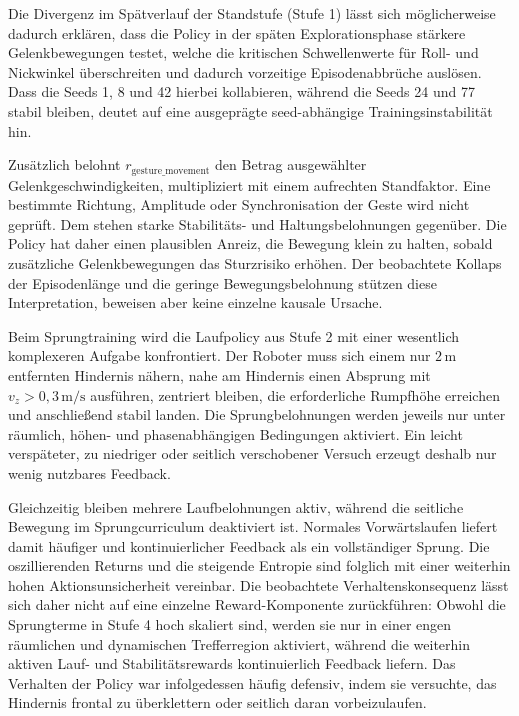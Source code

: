 Die Divergenz im Spätverlauf der Standstufe (Stufe 1) lässt sich möglicherweise dadurch erklären, dass die Policy in der späten Explorationsphase stärkere Gelenkbewegungen testet, welche die kritischen Schwellenwerte für Roll- und Nickwinkel überschreiten und dadurch vorzeitige Episodenabbrüche auslösen. Dass die Seeds 1, 8 und 42 hierbei kollabieren, während die Seeds 24 und 77 stabil bleiben, deutet auf eine ausgeprägte seed-abhängige Trainingsinstabilität hin.

Zusätzlich belohnt $r_{\text{gesture\_movement}}$ den Betrag ausgewählter Gelenkgeschwindigkeiten, multipliziert mit einem aufrechten Standfaktor. Eine bestimmte Richtung, Amplitude oder Synchronisation der Geste wird nicht geprüft. Dem stehen starke Stabilitäts- und Haltungsbelohnungen gegenüber. Die Policy hat daher einen plausiblen Anreiz, die Bewegung klein zu halten, sobald zusätzliche Gelenkbewegungen das Sturzrisiko erhöhen. Der beobachtete Kollaps der Episodenlänge und die geringe Bewegungsbelohnung stützen diese Interpretation, beweisen aber keine einzelne kausale Ursache.

Beim Sprungtraining wird die Laufpolicy aus Stufe 2 mit einer wesentlich komplexeren Aufgabe konfrontiert. Der Roboter muss sich einem nur $2\,\text{m}$ entfernten Hindernis nähern, nahe am Hindernis einen Absprung mit $v_z>0{,}3\,\text{m/s}$ ausführen, zentriert bleiben, die erforderliche Rumpfhöhe erreichen und anschließend stabil landen. Die Sprungbelohnungen werden jeweils nur unter räumlich, höhen- und phasenabhängigen Bedingungen aktiviert. Ein leicht verspäteter, zu niedriger oder seitlich verschobener Versuch erzeugt deshalb nur wenig nutzbares Feedback.

Gleichzeitig bleiben mehrere Laufbelohnungen aktiv, während die seitliche Bewegung im Sprungcurriculum deaktiviert ist. Normales Vorwärtslaufen liefert damit häufiger und kontinuierlicher Feedback als ein vollständiger Sprung. Die oszillierenden Returns und die steigende Entropie sind folglich mit einer weiterhin hohen Aktionsunsicherheit vereinbar. Die beobachtete Verhaltenskonsequenz lässt sich daher nicht auf eine einzelne Reward-Komponente zurückführen: Obwohl die Sprungterme in Stufe 4 hoch skaliert sind, werden sie nur in einer engen räumlichen und dynamischen Trefferregion aktiviert, während die weiterhin aktiven Lauf- und Stabilitätsrewards kontinuierlich Feedback liefern. Das Verhalten der Policy war infolgedessen häufig defensiv, indem sie versuchte, das Hindernis frontal zu überklettern oder seitlich daran vorbeizulaufen.


